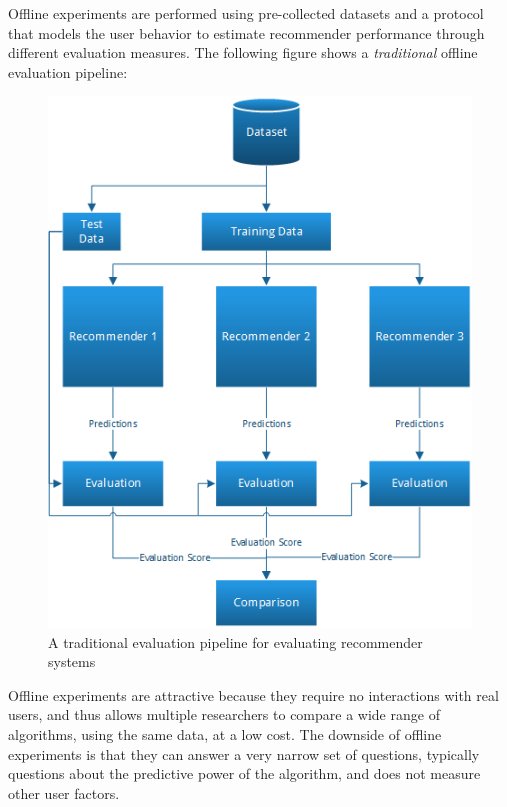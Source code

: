 Offline experiments are performed using pre-collected datasets and a protocol
that models the user behavior to estimate recommender performance through
different evaluation measures. The following figure shows a \emph{traditional}
offline evaluation pipeline:

\begin{figure}[H]
		\centering
	  	\includegraphics[scale=0.6]{image/evaluationpipeline.png}
		\caption[A Traditional Evaluation Pipeline]{A traditional evaluation pipeline for evaluating recommender systems}
		\label{figure:evaluationpipeline}
\end{figure}

Offline experiments are attractive because they require no interactions with
real users, and thus allows multiple researchers to compare a wide range of
algorithms, using the same data, at a low cost. The downside of offline
experiments is that they can answer a very narrow set of questions, typically
questions about the predictive power of the algorithm, and does not measure
other user factors.


